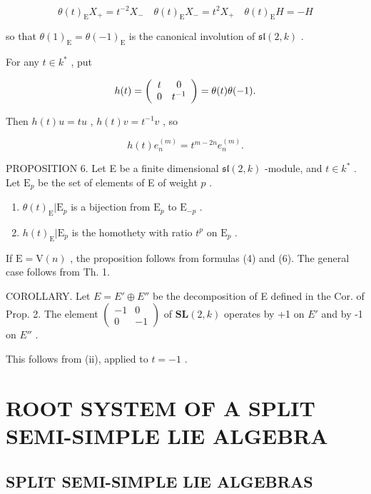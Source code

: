 \[
\theta (t) _ {\mathrm{E}} X _ {+} = t ^ {- 2} X _ {-} \quad \theta (t) _ {\mathrm{E}} X _ {-} = t ^ {2} X _ {+} \quad \theta (t) _ {\mathrm{E}} H = - H\tag{5}
\]

so that \(\theta(1)_{\mathrm{E}} = \theta(-1)_{\mathrm{E}}\) is the canonical involution of \(\mathfrak{sl}(2,k)\) .

For any \(t\in k^{*}\) , put

\[
h (t) = \left( \begin{array}{c c} t & 0 \\ 0 & t ^ {- 1} \end{array} \right) = \theta (t) \theta (- 1).
\]

Then \(h(t)u = tu\) , \(h(t)v = t^{-1}v\) , so

\[
h (t) e _ {n} ^ {(m)} = t ^ {m - 2 n} e _ {n} ^ {(m)}.\tag{6}
\]

PROPOSITION 6. Let E be a finite dimensional \(\mathfrak{sl}(2,k)\) -module, and \(t\in k^{*}\) . Let \(\mathrm{E}_p\) be the set of elements of E of weight \(p\) .

\begin{enumerate}
\def\labelenumi{(\roman{enumi})}
\item
  \(\theta(t)_{\mathrm{E}}|\mathrm{E}_{p}\) is a bijection from \(\mathrm{E}_p\) to \(\mathrm{E}_{-p}\) .
\item
  \(h(t)_{\mathrm{E}}|\mathrm{E}_p\) is the homothety with ratio \(t^p\) on \(\mathrm{E}_p\) .
\end{enumerate}

If \(\mathrm{E} = \mathrm{V}(n)\) , the proposition follows from formulas (4) and (6). The general case follows from Th. 1.

COROLLARY. Let \(E = E' \oplus E''\) be the decomposition of E defined in the Cor. of Prop. 2. The element \(\begin{pmatrix}-1 & 0 \\ 0 & -1\end{pmatrix}\) of \(\mathbf{SL}(2, k)\) operates by +1 on \(E'\) and by -1 on \(E''\) .

This follows from (ii), applied to \(t = -1\) .

\section{ROOT SYSTEM OF A SPLIT SEMI-SIMPLE LIE ALGEBRA}

\subsection{SPLIT SEMI-SIMPLE LIE ALGEBRAS}

